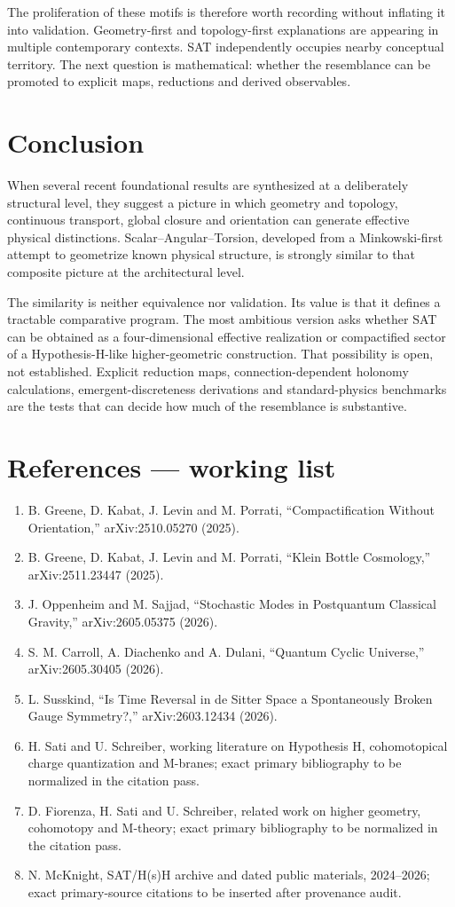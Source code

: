 \documentclass[11pt]{article}
\begin{document}
The proliferation of these motifs is therefore worth recording without inflating it into validation. Geometry-first and topology-first explanations are appearing in multiple contemporary contexts. SAT independently occupies nearby conceptual territory. The next question is mathematical: whether the resemblance can be promoted to explicit maps, reductions and derived observables.

\section{Conclusion}
When several recent foundational results are synthesized at a deliberately structural level, they suggest a picture in which geometry and topology, continuous transport, global closure and orientation can generate effective physical distinctions. Scalar--Angular--Torsion, developed from a Minkowski-first attempt to geometrize known physical structure, is strongly similar to that composite picture at the architectural level.

The similarity is neither equivalence nor validation. Its value is that it defines a tractable comparative program. The most ambitious version asks whether SAT can be obtained as a four-dimensional effective realization or compactified sector of a Hypothesis-H-like higher-geometric construction. That possibility is open, not established. Explicit reduction maps, connection-dependent holonomy calculations, emergent-discreteness derivations and standard-physics benchmarks are the tests that can decide how much of the resemblance is substantive.

\section*{References --- working list}
\begin{enumerate}
\item B. Greene, D. Kabat, J. Levin and M. Porrati, ``Compactification Without Orientation,'' arXiv:2510.05270 (2025).
\item B. Greene, D. Kabat, J. Levin and M. Porrati, ``Klein Bottle Cosmology,'' arXiv:2511.23447 (2025).
\item J. Oppenheim and M. Sajjad, ``Stochastic Modes in Postquantum Classical Gravity,'' arXiv:2605.05375 (2026).
\item S. M. Carroll, A. Diachenko and A. Dulani, ``Quantum Cyclic Universe,'' arXiv:2605.30405 (2026).
\item L. Susskind, ``Is Time Reversal in de Sitter Space a Spontaneously Broken Gauge Symmetry?,'' arXiv:2603.12434 (2026).
\item H. Sati and U. Schreiber, working literature on Hypothesis H, cohomotopical charge quantization and M-branes; exact primary bibliography to be normalized in the citation pass.
\item D. Fiorenza, H. Sati and U. Schreiber, related work on higher geometry, cohomotopy and M-theory; exact primary bibliography to be normalized in the citation pass.
\item N. McKnight, SAT/H(s)H archive and dated public materials, 2024--2026; exact primary-source citations to be inserted after provenance audit.
\end{enumerate}
\end{document}
